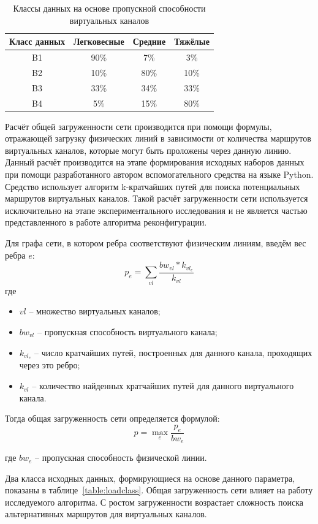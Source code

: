 \documentclass[12pt, a4paper]{article}
\begin{document}
\begin{table}[h]
	\caption{Классы данных на основе пропускной способности виртуальных каналов}
	\label{table:bwclass}
\begin{center}
\begin{tabular}{|c|c|c|c|}
\hline
	 Класс данных& Легковесные & Средние & Тяжёлые\\
\hline
	B1 & 90\% & 7\% & 3\% \\
\hline
 B2 & 10\% & 80\% & 10\% \\
\hline
	B3 & 33\% & 34\% & 33\% \\
\hline
	B4 & 5\% & 15\% & 80\% \\
\hline
\end{tabular}
\end{center}
\end{table}

Расчёт общей загруженности сети производится при помощи формулы, отражающей загрузку физических линий в зависимости от количества маршрутов виртуальных каналов, которые могут быть проложены через данную линию. Данный расчёт производится на этапе формирования исходных наборов данных при помощи разработанного автором вспомогательного средства на языке Python. Средство использует алгоритм k-кратчайших путей для поиска потенциальных маршрутов виртуальных каналов. Такой расчёт загруженности сети используется исключительно на этапе экспериментального исследования и не является частью представленного в работе алгоритма реконфигурации.

Для графа сети, в котором ребра соответствуют физическим линиям, введём вес ребра $e$:
$$p_{e} = \sum_{vl}\frac{bw_{vl} \ast k_{vl_e}}{k_{vl}}$$
где 
\begin{itemize}
	\item $vl$ -- множество виртуальных каналов;
	\item $bw_{vl}$ -- пропускная способность виртуального канала;
	\item $k_{vl_e}$ -- число кратчайших путей, построенных для данного канала, проходящих через это ребро;
	\item $k_{vl}$ -- количество найденных кратчайших путей для данного виртуального канала.
\end{itemize}

Тогда общая загруженность сети определяется формулой:
$$p = \max_{e}\frac{p_{e}}{bw_{e}}$$

где $bw_{e}$ -- пропускная способность физической линии.

Два класса исходных данных, формирующиеся на основе данного параметра, показаны в таблице~\ref{table:loadclass}. Общая загруженность сети влияет на работу исследуемого алгоритма. С ростом загруженности возрастает сложность поиска альтернативных маршрутов для виртуальных каналов. 
\end{document}
